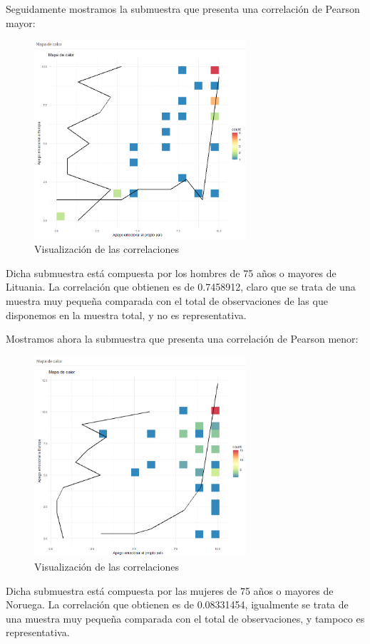 \documentclass{article}
\begin{document}
\noindent Seguidamente mostramos la submuestra que presenta una correlación de Pearson mayor:
 \begin{figure}[H]
 \centering
 \includegraphics[width=0.7\textwidth]{Imatge1.png}
 \caption{Visualización de las correlaciones}
 \end{figure}
\noindent Dicha submuestra está compuesta por los hombres de 75 años o mayores de Lituania. La correlación que obtienen es de 0.7458912, claro que se trata de una muestra muy pequeña comparada con el total de observaciones de las que disponemos en la muestra total, y no es representativa.


\noindent Mostramos ahora la submuestra que presenta una correlación de Pearson menor:
 \begin{figure}[H]
 \centering
 \includegraphics[width=0.7\textwidth]{Imatge2.png}
 \caption{Visualización de las correlaciones}
 \end{figure}
\noindent Dicha submuestra está compuesta por las mujeres de 75 años o mayores de Noruega. La correlación que obtienen es de 0.08331454, igualmente se trata de una muestra muy pequeña comparada con el total de observaciones, y tampoco es representativa.
\end{document}
